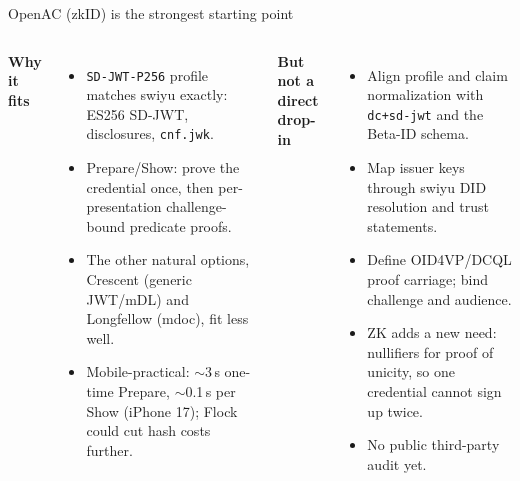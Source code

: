 \documentclass[aspectratio=169]{beamer}
\newcommand{\sourcefoot}{}
\newcommand{\setsources}[1]{\renewcommand{\sourcefoot}{#1}}
\newcommand{\labelhead}[1]{{\small\bfseries\color{zkblue}#1}\par\vspace{0.25em}}
\begin{document}
\setsources{\href{https://github.com/privacy-ethereum/zkID}{zkID repo}; \href{https://eprint.iacr.org/2026/251}{OpenAC paper}; \href{https://github.com/microsoft/crescent-credentials}{Crescent}; \href{https://github.com/google/longfellow-zk}{Longfellow}; \href{https://github.com/succinctlabs/flock/blob/main/paper/flock-paper.pdf}{Flock paper}}
\begin{frame}{OpenAC (zkID) is the strongest starting point}
  \begin{columns}[T,onlytextwidth]
      \labelhead{Why it fits}
      \begin{itemize}
        \item \texttt{SD-JWT-P256} profile matches swiyu exactly: ES256 SD-JWT,
          disclosures, \texttt{cnf.jwk}.
        \item Prepare/Show: prove the credential once, then per-presentation
          challenge-bound predicate proofs.
        \item The other natural options, Crescent (generic JWT/mDL) and
          Longfellow (mdoc), fit less well.
        \item Mobile-practical: $\sim$3\,s one-time Prepare, $\sim$0.1\,s per
          Show (iPhone 17); Flock could cut hash costs further.
      \end{itemize}

      \labelhead{But not a direct drop-in}
      \begin{itemize}
        \item Align profile and claim normalization with \texttt{dc+sd-jwt} and
          the Beta-ID schema.
        \item Map issuer keys through swiyu DID resolution and trust statements.
        \item Define OID4VP/DCQL proof carriage; bind challenge and audience.
        \item ZK adds a new need: nullifiers for proof of unicity, so one
          credential cannot sign up twice.
        \item No public third-party audit yet.
      \end{itemize}
  \end{columns}
\end{frame}
\end{document}
